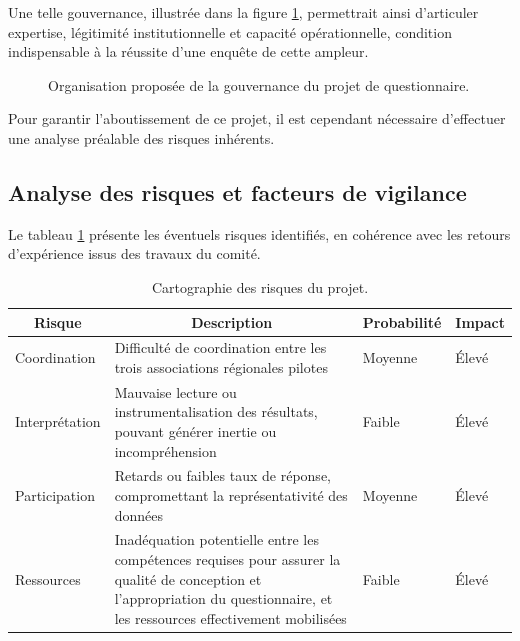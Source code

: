 \documentclass[12pt,a4paper]{article}
\begin{document}
Une telle gouvernance, illustrée dans la figure \ref{fig:gouvernance-triptyque}, permettrait ainsi d'articuler expertise, légitimité institutionnelle et capacité opérationnelle, condition indispensable à la réussite d'une enquête de cette ampleur.

\begin{figure}[H]
\centering
\scalebox{1.5}{%

}
\caption{Organisation proposée de la gouvernance du projet de questionnaire.}
\label{fig:gouvernance-triptyque}
\end{figure}

Pour garantir l'aboutissement de ce projet, il est cependant nécessaire d'effectuer une analyse préalable des risques inhérents.

\clearpage

\subsection{Analyse des risques et facteurs de vigilance}

Le tableau \ref{tab:risques} présente les éventuels risques identifiés, en cohérence avec les retours d'expérience issus des travaux du comité.

\begin{table}[h]
\centering
\begin{tabular}{|p{3cm}|p{5cm}|p{2cm}|p{2cm}|}
\hline
\multicolumn{1}{|c|}{\textbf{Risque}} &
\multicolumn{1}{c|}{\textbf{Description}} &
\multicolumn{1}{c|}{\textbf{Probabilité}} &
\multicolumn{1}{c|}{\textbf{Impact}} \\
\hline
Coordination & Difficulté de coordination entre les trois associations régionales pilotes & Moyenne & Élevé \\
\hline
Interprétation & Mauvaise lecture ou instrumentalisation des résultats, pouvant générer inertie ou incompréhension & Faible & Élevé \\
\hline
Participation & Retards ou faibles taux de réponse, compromettant la représentativité des données & Moyenne & Élevé \\
\hline
Ressources & Inadéquation potentielle entre les compétences requises pour assurer la qualité de conception et l'appropriation du questionnaire, et les ressources effectivement mobilisées & Faible & Élevé \\
\hline
\end{tabular}
\caption{Cartographie des risques du projet.}
\label{tab:risques}
\end{table}
\end{document}
